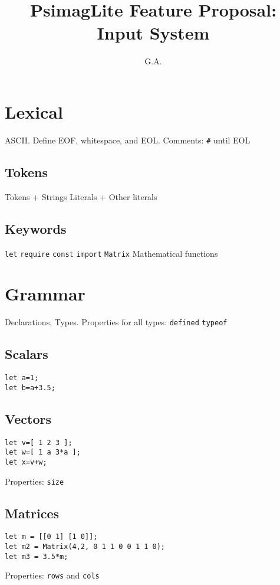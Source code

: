 \documentclass[twocolumn]{article}
\begin{document}
\title{PsimagLite Feature Proposal:\\
Input System}
\author{G.A.}
\maketitle

\section{Lexical}
ASCII.
Define EOF, whitespace, and EOL.
Comments: \verb!#! until EOL

\subsection{Tokens}
Tokens + Strings Literals + Other literals

\subsection{Keywords}
\verb!let! \verb!require! \verb!const! \verb!import! \verb!Matrix!
Mathematical functions

\section{Grammar}
Declarations, Types.
Properties for all types: \verb!defined! \verb!typeof!

\subsection{Scalars} 
\begin{verbatim}
let a=1;
let b=a+3.5;
\end{verbatim}
\subsection{Vectors} 
\begin{verbatim}
let v=[ 1 2 3 ];
let w=[ 1 a 3*a ];
let x=v+w;
\end{verbatim}
Properties: \verb!size!

\subsection{Matrices} 
\begin{verbatim}
let m = [[0 1] [1 0]];
let m2 = Matrix(4,2, 0 1 1 0 0 1 1 0);
let m3 = 3.5*m;
\end{verbatim}
Properties: \verb!rows! and \verb!cols!
\end{document}
